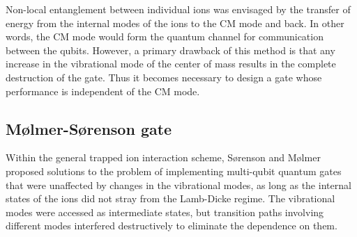 \documentclass[12pt,a4paper]{amsart}
\numberwithin{equation}{section}
\theoremstyle{plain}
\theoremstyle{definition}
\begin{document}
Non-local entanglement between individual ions was envisaged by the transfer of energy from the internal modes of the ions to the CM mode and back. In other words, the CM mode would form the quantum channel for communication between the qubits. However, a primary drawback of this method is that any increase in the vibrational mode of the center of mass results in the complete destruction of the gate. Thus it becomes necessary to design a gate whose performance is independent of the CM mode.


\subsection{M\o lmer-S\o renson gate}


Within the general trapped ion interaction scheme,
S\o renson and M\o lmer proposed solutions to the problem of implementing multi-qubit quantum gates that were unaffected by changes in the vibrational modes, as long as the internal states of the ions did not stray from the Lamb-Dicke regime. \cite{ioniTherComp} The vibrational modes were accessed as intermediate states, but transition paths involving different modes interfered destructively to eliminate the dependence on them.
\end{document}
